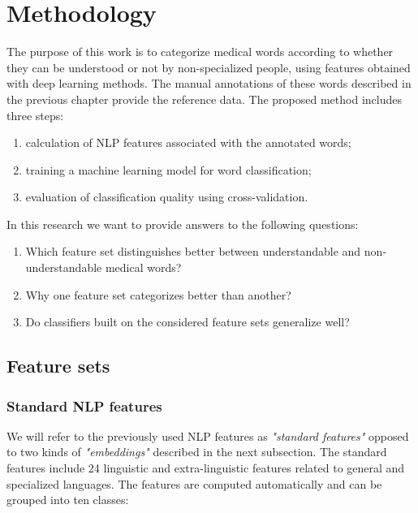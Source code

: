 \chapter{Methodology}
\label{ch:methodology}

The purpose of this work is to categorize medical words according to whether they can be understood or not by non-specialized people, using features obtained with deep learning methods. The manual annotations of these words described in the previous chapter provide the reference data. The proposed method includes three steps: 
\begin{enumerate}
    \item calculation of NLP features associated with the annotated words;
    \item training a machine learning model for word classification;
    \item evaluation of classification quality using cross-validation.
\end{enumerate}
%
In this research we want to provide answers to the following questions:
\begin{enumerate}
    \item Which feature set distinguishes better between understandable and non-understandable medical words?
    \item Why one feature set categorizes better than another?
    \item Do classifiers built on the considered feature sets generalize well? 
\end{enumerate}


\section{Feature sets}
\subsection{Standard NLP features}
\label{sec:standard-features}
We will refer to the previously used NLP features  \citep{Grabar-PITR2014} as \textit{"standard features"} opposed to two kinds of \textit{"embeddings"} described in the next subsection. The standard features include 24 linguistic and extra-linguistic features related to general and specialized languages. The features are computed automatically and can be grouped into ten classes: 

